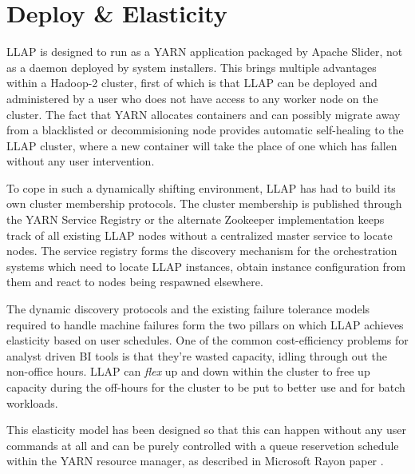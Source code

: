 \section{Deploy \& Elasticity}

LLAP is designed to run as a YARN application packaged by Apache Slider\cite{slider}, not as a daemon deployed by system installers. This brings multiple advantages within a Hadoop-2 cluster, first of which is that 
LLAP can be deployed and administered by a user who does not have access to any worker node on the cluster. The fact that YARN allocates containers and can possibly migrate away
from a blacklisted or decommisioning node provides automatic self-healing to the LLAP cluster, where a new container will take the place of one which has fallen without any user
intervention.

To cope in such a dynamically shifting environment, LLAP has had to build its own cluster membership protocols. The cluster membership is published through the YARN Service Registry or the 
alternate Zookeeper implementation keeps track of all existing LLAP nodes without a centralized master service to locate nodes. The service registry forms the discovery mechanism for the
orchestration systems which need to locate LLAP instances, obtain instance configuration from them and react to nodes being respawned elsewhere.

The dynamic discovery protocols and the existing failure tolerance models required to handle machine failures form the two pillars on which LLAP achieves elasticity based on user schedules. 
One of the common cost-efficiency problems for analyst driven BI tools is that they're wasted capacity, idling through out the non-office hours.  LLAP can \emph{flex} up and down within the
cluster to free up capacity during the off-hours for the cluster to be put to better use and for batch workloads.

This elasticity model has been designed so that this can happen without any user commands at all and can be purely controlled with a queue reservetion schedule within the YARN resource manager, as described in Microsoft Rayon paper \cite{rayon}.
